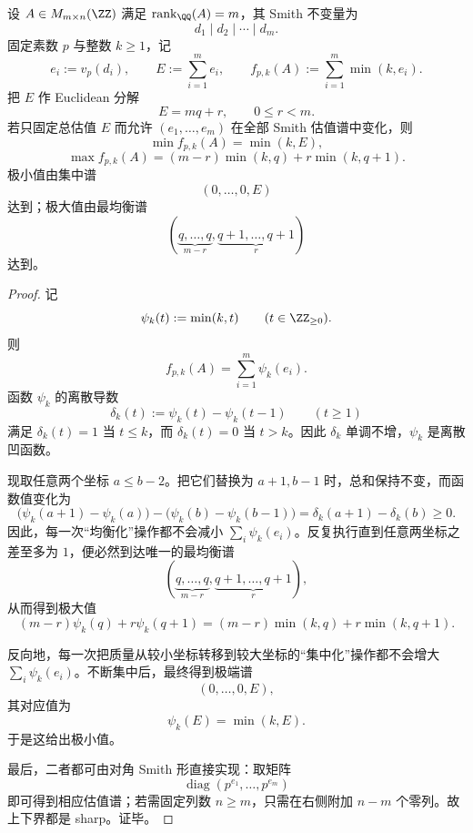 \begin{theorem}\label{thm:xi-time-part74-smith-loss-fixed-total-valuation-extremal}
设 \(A\in M_{m\times n}(\ZZ)\) 满足 \(\operatorname{rank}_{\QQ}(A)=m\)，其 Smith 不变量为
\[
d_1\mid d_2\mid \cdots \mid d_m.
\]
固定素数 \(p\) 与整数 \(k\ge 1\)，记
\[
e_i:=v_p(d_i),
\qquad
E:=\sum_{i=1}^{m}e_i,
\qquad
f_{p,k}(A):=\sum_{i=1}^{m}\min(k,e_i).
\]
把 \(E\) 作 Euclidean 分解
\[
E=mq+r,
\qquad
0\le r<m.
\]
若只固定总估值 \(E\) 而允许 \((e_1,\dots,e_m)\) 在全部 Smith 估值谱中变化，则
\[
\boxed{\;
\min f_{p,k}(A)=\min(k,E),\;}
\]
\[
\boxed{\;
\max f_{p,k}(A)=(m-r)\min(k,q)+r\min(k,q+1).\;}
\]
极小值由集中谱
\[
(0,\dots,0,E)
\]
达到；极大值由最均衡谱
\[
(\underbrace{q,\dots,q}_{m-r},\underbrace{q+1,\dots,q+1}_{r})
\]
达到。
\end{theorem}
\begin{proof}
记
\[
\psi_k(t):=\min(k,t)
\qquad (t\in \ZZ_{\ge 0}).
\]
则
\[
f_{p,k}(A)=\sum_{i=1}^{m}\psi_k(e_i).
\]
函数 \(\psi_k\) 的离散导数
\[
\delta_k(t):=\psi_k(t)-\psi_k(t-1)
\qquad (t\ge 1)
\]
满足 \(\delta_k(t)=1\) 当 \(t\le k\)，而 \(\delta_k(t)=0\) 当 \(t>k\)。因此 \(\delta_k\) 单调不增，\(\psi_k\) 是离散凹函数。

现取任意两个坐标 \(a\le b-2\)。把它们替换为 \(a+1,b-1\) 时，总和保持不变，而函数值变化为
\[
\bigl(\psi_k(a+1)-\psi_k(a)\bigr)-\bigl(\psi_k(b)-\psi_k(b-1)\bigr)
=
\delta_k(a+1)-\delta_k(b)\ge 0.
\]
因此，每一次“均衡化”操作都不会减小 \(\sum_i\psi_k(e_i)\)。反复执行直到任意两坐标之差至多为 \(1\)，便必然到达唯一的最均衡谱
\[
(\underbrace{q,\dots,q}_{m-r},\underbrace{q+1,\dots,q+1}_{r}),
\]
从而得到极大值
\[
(m-r)\psi_k(q)+r\psi_k(q+1)
=(m-r)\min(k,q)+r\min(k,q+1).
\]

反向地，每一次把质量从较小坐标转移到较大坐标的“集中化”操作都不会增大 \(\sum_i\psi_k(e_i)\)。不断集中后，最终得到极端谱
\[
(0,\dots,0,E),
\]
其对应值为
\[
\psi_k(E)=\min(k,E).
\]
于是这给出极小值。

最后，二者都可由对角 Smith 形直接实现：取矩阵
\[
\operatorname{diag}(p^{e_1},\dots,p^{e_m})
\]
即可得到相应估值谱；若需固定列数 \(n\ge m\)，只需在右侧附加 \(n-m\) 个零列。故上下界都是 sharp。证毕。
\end{proof}


